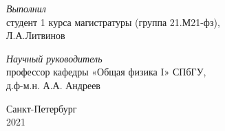 \begin{titlepage}
\begin{center}
        \vfill
        

        \begin{minipage}{0.9\textwidth}
            \begin{flushright}
                \textit{Выполнил}\\ студент 1 курса магистратуры (группа 21.М21-фз), \\ Л.А.Литвинов
            \end{flushright}
        \end{minipage}
        \vfill
        \begin{minipage}{0.9\textwidth}
            \begin{flushright}
                \textit{Научный руководитель}\\ профессор кафедры «Общая физика I» СПбГУ, \\ д.ф-м.н. А.А. Андреев
            \end{flushright}
        \end{minipage}
        
        
        \vfill\vfill\vfill
        
        {Санкт-Петербург \\ 2021}
        
    \end{center}
\end{titlepage}